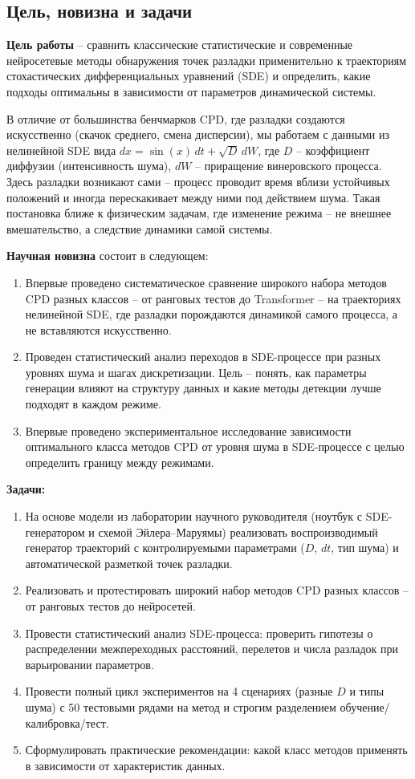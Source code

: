 \documentclass[12pt,a4paper]{article}
\begin{document}
\subsection{Цель, новизна и задачи}

\textbf{Цель работы}  -- сравнить классические статистические и современные нейросетевые методы обнаружения точек разладки применительно к траекториям стохастических дифференциальных уравнений (SDE) и определить, какие подходы оптимальны в зависимости от параметров динамической системы.

В отличие от большинства бенчмарков CPD, где разладки создаются искусственно (скачок среднего, смена дисперсии), мы работаем с данными из нелинейной SDE вида $dx = \sin(x)\,dt + \sqrt{D}\,dW$, где $D$  -- коэффициент диффузии (интенсивность шума), $dW$  -- приращение винеровского процесса. Здесь разладки возникают сами  -- процесс проводит время вблизи устойчивых положений и иногда перескакивает между ними под действием шума. Такая постановка ближе к физическим задачам, где изменение режима  -- не внешнее вмешательство, а следствие динамики самой системы.

\textbf{Научная новизна} состоит в следующем:
\begin{enumerate}
    \item Впервые проведено систематическое сравнение широкого набора методов CPD разных классов  -- от ранговых тестов до Transformer  -- на траекториях нелинейной SDE, где разладки порождаются динамикой самого процесса, а не вставляются искусственно.
    \item Проведен статистический анализ переходов в SDE-процессе при разных уровнях шума и шагах дискретизации. Цель  -- понять, как параметры генерации влияют на структуру данных и какие методы детекции лучше подходят в каждом режиме.
    \item Впервые проведено экспериментальное исследование зависимости оптимального класса методов CPD от уровня шума в SDE-процессе с целью определить границу между режимами.
\end{enumerate}

\textbf{Задачи:}
\begin{enumerate}
    \item На основе модели из лаборатории научного руководителя (ноутбук с SDE-генератором и схемой Эйлера--Маруямы) реализовать воспроизводимый генератор траекторий с контролируемыми параметрами ($D$, $dt$, тип шума) и автоматической разметкой точек разладки.
    \item Реализовать и протестировать широкий набор методов CPD разных классов -- от ранговых тестов до нейросетей.
    \item Провести статистический анализ SDE-процесса: проверить гипотезы о распределении межпереходных расстояний, перелетов и числа разладок при варьировании параметров.
    \item Провести полный цикл экспериментов на 4 сценариях (разные $D$ и типы шума) с 50 тестовыми рядами на метод и строгим разделением обучение/калибровка/тест.
    \item Сформулировать практические рекомендации: какой класс методов применять в зависимости от характеристик данных.
\end{enumerate}
\end{document}
